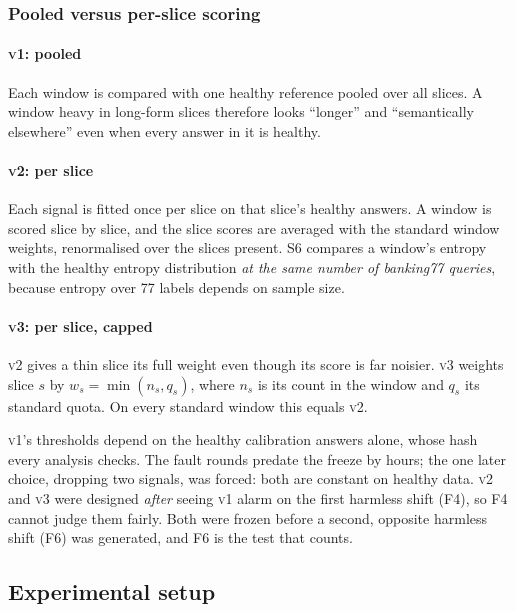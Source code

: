 \documentclass[11pt]{article}
\newcommand{\vone}{\textsc{v1}}
\newcommand{\vtwo}{\textsc{v2}}
\newcommand{\vthree}{\textsc{v3}}
\begin{document}
\subsubsection{Pooled versus per-slice scoring}
\label{sec:scoring}
\paragraph{\vone: pooled} Each window is compared with one healthy reference
pooled over all slices. A window heavy in long-form slices therefore looks
``longer'' and ``semantically elsewhere'' even when every answer in it is healthy.

\paragraph{\vtwo: per slice} Each signal is fitted once per slice on that slice's
healthy answers. A window is scored slice by slice, and the slice scores are
averaged with the standard window weights, renormalised over the slices present.
S6 compares a window's entropy with the healthy entropy distribution \emph{at the
same number of banking77 queries}, because entropy over 77 labels depends on
sample size.

\paragraph{\vthree: per slice, capped} \vtwo{} gives a thin slice its full weight
even though its score is far noisier. \vthree{} weights slice $s$ by
$w_s=\min(n_s, q_s)$, where $n_s$ is its count in the window and $q_s$ its
standard quota. On every standard window this equals \vtwo.

\vone{}'s thresholds depend on the healthy calibration answers alone, whose hash
every analysis checks. The fault rounds predate the freeze by hours; the one later
choice, dropping two signals, was forced: both are constant on healthy data. \vtwo{} and \vthree{} were
designed \emph{after} seeing \vone{} alarm on the first harmless shift (F4), so
F4 cannot judge them fairly. Both were frozen before a second, opposite harmless
shift (F6) was generated, and F6 is the test that counts.

\subsection{Experimental setup}
\label{app:fixed-setup}
\end{document}
